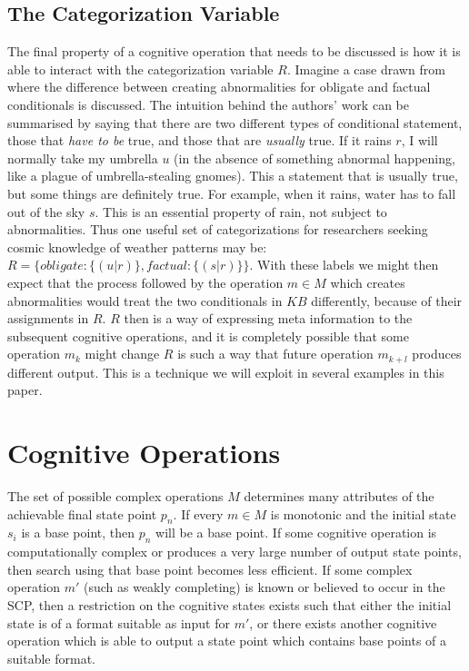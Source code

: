\subsection{The Categorization Variable}
The final property of a cognitive operation that needs to be discussed is how it is able to interact with the categorization variable $R$. Imagine a case drawn from \cite{saldanha2017weak} where the difference between creating abnormalities for obligate and factual conditionals is discussed. The intuition behind the authors' work can be summarised by saying that there are two different types of conditional statement, those that \textit{have to be} true, and those that are \textit{usually} true. If it rains $r$, I will normally take my umbrella $u$ (in the absence of something abnormal happening, like a plague of umbrella-stealing gnomes). This a statement that is usually true, but some things are definitely true. For example, when it rains, water has to fall out of the sky $s$. This is an essential property of rain, not subject to abnormalities. Thus one useful set of categorizations for researchers seeking cosmic knowledge of weather patterns may be: $R=\{obligate: \{(u|r)\}, factual: \{(s|r)\} \}$. With these labels we might then expect that the process followed by the operation $m \in M$ which creates abnormalities would treat the two conditionals in $KB$ differently, because of their assignments in $R$. $R$ then is a way of expressing meta information to the subsequent cognitive operations, and it is completely possible that some operation $m_k$ might change $R$ is such a way that future operation $m_{k+l}$ produces different output. This is a technique we will exploit in several examples in this paper.
\section{Cognitive Operations}
The set of possible complex operations $M$ determines many attributes of the achievable final state point $p_n$. If every $m \in M$ is monotonic and the initial state $s_i$ is a base point, then $p_n$ will be a base point. If some cognitive operation is computationally complex or produces a very large number of output state points, then search using that base point becomes less efficient. If some complex operation $m'$ (such as weakly completing) is known or believed to occur in the SCP, then a restriction on the cognitive states exists such that either the initial state is of a format suitable as input for $m'$, or there exists another cognitive operation which is able to output a state point which contains base points of a suitable format.

